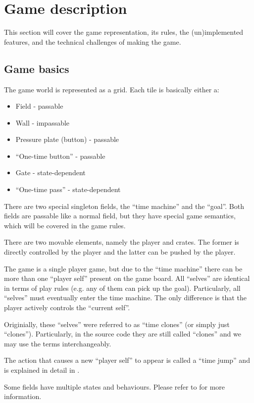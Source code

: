 \section{Game description}

This section will cover the game representation, its rules, the
(un)implemented features, and the technical challenges of making the
game.

\subsection{Game basics}
The game world is represented as a grid.  Each tile is basically
either a:

\begin{itemize}
\item Field - passable
\item Wall - impassable
\item Pressure plate (button) - passable
\item ``One-time button'' - passable
\item Gate - state-dependent
\item ``One-time pass'' - state-dependent
\end{itemize}

There are two special singleton fields, the ``time machine'' and
the ``goal''.  Both fields are passable like a normal field, but
they have special game semantics, which will be covered in the
game rules.

There are two movable elements, namely the player and crates.  The
former is directly controlled by the player and the latter can be
pushed by the player.

The game is a single player game, but due to the ``time machine''
there can be more than one ``player self'' present on the game board.
All ``selves'' are identical in terms of play rules (e.g. any of
them can pick up the goal).  Particularly, all ``selves'' must
eventually enter the time machine.  The only difference is that the
player actively controls the ``current self''.

Originially, these ``selves'' were referred to as ``time clones'' (or
simply just ``clones'').  Particularly, in the source code they are
still called ``clones'' and we may use the terms interchangeably.

The action that causes a new ``player self'' to appear is called a
``time jump'' and is explained in detail in .

Some fields have multiple states and behaviours.  Please refer to
 for more information.


